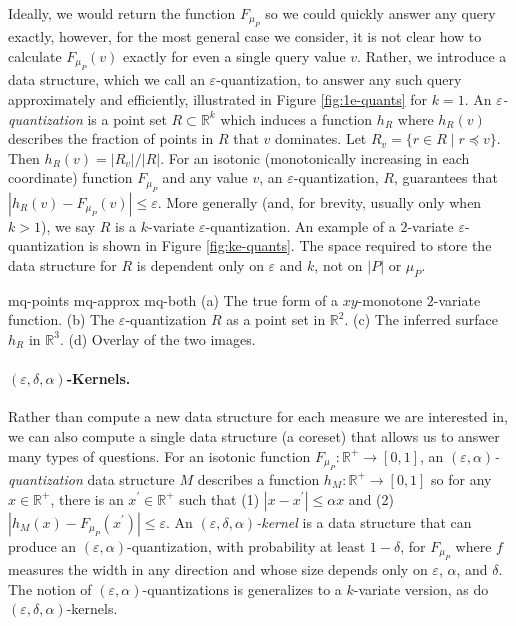 \documentclass{journal}
\newcommand{\eps}{\varepsilon}
\newcommand{\R}{\ensuremath{\mathbb{R}}}
\begin{document}
Ideally, we would return the function $F_{\mu_P}$ so we could quickly answer any query exactly, however, for the most general case we consider, it is not clear how to calculate $F_{\mu_P}(v)$ exactly for even a single query value $v$.
Rather, we introduce a data structure, which we call an $\eps$-quantization, to answer any such query approximately and efficiently, illustrated in Figure \ref{fig:1e-quants} for $k=1$.  An \emph{$\eps$-quantization} is a point set $R \subset \R^k$ which induces a function $h_R$ where $h_R(v)$ describes the fraction of points in $R$ that $v$ dominates.  Let $R_v = \{r \in R \mid r \preceq v\}$.  Then $h_R(v) = |R_v|/|R|$.
For an isotonic (monotonically increasing in each coordinate) function $F_{\mu_P}$ and any value $v$, an $\eps$-quantization, $R$, guarantees that
$
|h_R(v) - F_{\mu_P}(v)| \leq \eps.
$
More generally (and, for brevity, usually only when $k>1$), we say $R$ is a $k$-variate $\eps$-quantization.  An example of a $2$-variate $\eps$-quantization is shown in Figure \ref{fig:ke-quants}.
The space required to store the data structure for $R$ is dependent only on $\eps$ and $k$, not on $|P|$ or $\mu_P$.

 {mq-points} {mq-approx} {mq-both}
{ \label{fig:ke-quants}
  (a) The true form of a $xy$-monotone $2$-variate function.
  (b) The $\eps$-quantization $R$ as a point set in $\R^2$.
  (c) The inferred surface $h_R$ in $\R^3$.
  (d) Overlay of the two images.
}



\paragraph{$(\eps, \delta, \alpha)$-Kernels.}
Rather than compute a new data structure for each measure we are interested in, we can also compute a single data structure (a coreset) that allows us to answer many types of questions.
For an isotonic function $F_{\mu_P} : \R^+ \to [0,1]$, an \emph{$(\eps, \alpha)$-quantization} data structure $M$ describes a function $h_M : \R^+ \to [0,1]$ so for any $x \in \R^+$, there is an $x^\prime \in \R^+$ such that
(1) $|x-x^\prime| \leq \alpha x$ and
(2) $|h_M(x) - F_{\mu_P}(x^\prime)| \leq \eps$.
An \emph{$(\eps, \delta, \alpha)$-kernel} is a data structure that can produce an $(\eps, \alpha)$-quantization, with probability at least $1-\delta$, for $F_{\mu_P}$ where $f$ measures the width in any direction and whose size depends only on $\eps$, $\alpha$, and $\delta$.
The notion of $(\eps, \alpha)$-quantizations is generalizes to a $k$-variate version, as do $(\eps, \delta, \alpha)$-kernels. 
\end{document}
